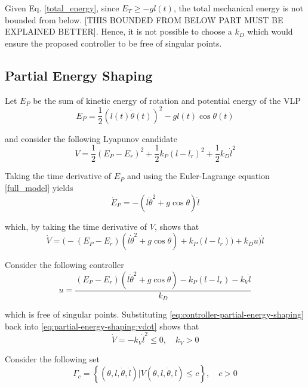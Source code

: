 \documentclass[main.tex]{subfiles}
\begin{document}
Given Eq. \eqref{total_energy}, since $E_T \ge -gl(t)$,
the total mechanical energy is not bounded from below.
[THIS BOUNDED FROM BELOW PART MUST BE EXPLAINED
BETTER].
Hence, it is not possible to choose a $k_D$ which would
ensure the proposed controller to be free of singular
points.

\subsection{Partial  Energy Shaping}
Let $E_P$ be the sum of kinetic energy of rotation and potential
energy of the VLP
\begin{equation}
  \label{eq:partial-energy}
  E_P = \frac{1}{2}(l(t)\dot{\theta}(t))^2-gl(t)\cos\theta(t)
\end{equation}

\noindent and consider the following Lyapunov candidate
\begin{equation}
  \label{eq:lyapunov-function-partial-energy-shaping}
  V = \frac{1}{2}(E_P-E_r)^2+\frac{1}{2}k_P(l-l_r)^2+
      \frac{1}{2}k_D\dot{l}^2
\end{equation}

Taking the time derivative of $E_P$ and using the Euler-Lagrange
equation \eqref{full_model} yields
\begin{equation}
  \dot{E}_P = -(l\dot{\theta}^2+g\cos\theta)\dot{l}
\end{equation}

\noindent which, by taking the time derivative of $V$, shows that
\begin{equation}
  \label{eq:partial-energy-shaping:vdot}
  \dot{V} = \big(-(E_P-E_r)(l\dot{\theta}^2+g\cos\theta)+k_P(l-l_r)\big) + k_D u) \dot{l}
\end{equation}

Consider the following controller
\begin{equation}
  \label{eq:controller-partial-energy-shaping}
  u = \frac{(E_P-E_r)(l\dot{\theta}^2+g\cos\theta)-k_P(l-l_r)
      -k_V\dot{l}}{k_D}
\end{equation}

\noindent which is free of singular points. Substituting
\eqref{eq:controller-partial-energy-shaping} back into 
\eqref{eq:partial-energy-shaping:vdot} shows that
\begin{equation}
  \label{eq:partial-energy-shaping:v-nsd}
  \dot{V} = -k_V \dot{l}^2 \le 0, \quad k_V > 0
\end{equation}

Consider the following set
\begin{equation}
  \Gamma_c = \left\{(\theta,l,\dot{\theta},\dot{l})|
      V(\theta,l,\dot{\theta},\dot{l}) \le c\right\},
      \quad c > 0
\end{equation}
\end{document}
